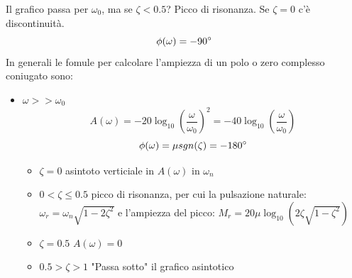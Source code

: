 \documentclass[a4paper]{article}
\begin{document}
\begin{enumerate}
\begin{itemize}
        Il grafico passa per $\omega_0$, ma se $\zeta <0.5$? Picco di risonanza.
        Se $\zeta = 0$ c'è discontinuità.
        \[\phi(\omega)  = -90\degree\]
        In generali le fomule per calcolare l'ampiezza di un polo o zero complesso coniugato sono:
        \begin{itemize}
            \item $\omega >> \omega_0$
            \[A(\omega) = -20\log_{10} \left(\frac{\omega}{\omega_0}\right)^2 = -40\log_{10} \left(\frac{\omega}{\omega_0}\right)\]
            \[\phi(\omega) = \mu sgn(\zeta) = -180\degree\]
            \begin{itemize}
                \item $\zeta = 0$ asintoto verticiale in $A(\omega)$ in $\omega_n$
                \item $0 < \zeta \le 0.5$ picco di risonanza, per cui la pulsazione naturale: $\omega_r = \omega_n\sqrt{1-2\zeta^2}$ e l'ampiezza del picco: $M_r = 20\mu\log_{10}(2\zeta\sqrt{1-\zeta^2})$
                \item $\zeta = 0.5$ $A(\omega) = 0$
                \item $0.5 > \zeta > 1$ "Passa sotto" il grafico asintotico
            \end{itemize}
        \end{itemize}
    \end{itemize}
\end{enumerate}
\end{document}
